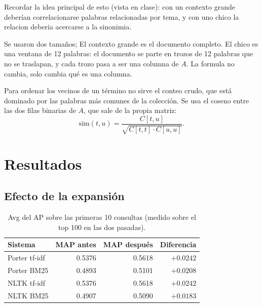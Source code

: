 \documentclass[11pt,letterpaper]{article}
\begin{document}
Recordar la idea principal de esto (vista en clase): con un contexto grande deberían correlacionarse palabras
relacionadas por tema, y con uno chico la relacion deberia acercarse a
la sinonimia. 

Se usaron dos tamaños; El contexto grande es el
documento completo. El chico es una ventana de 12 palabras: el
documento se parte en trozos de 12 palabras que no se traslapan, y
cada trozo pasa a ser una columna de $A$. La formula no cambia, solo
cambia qué es una columna.

Para ordenar los vecinos de un término no sirve el conteo crudo, que
está dominado por las palabras más comunes de la colección. Se usa el
coseno entre las dos filas binarias de $A$, que sale de la propia
matriz:
\[
    \mathrm{sim}(t, u) = \frac{C[t,u]}{\sqrt{C[t,t] \cdot C[u,u]}} .
\]


\section{Resultados}

\subsection*{Efecto de la expansión}

\begin{table}[H]
  \centering
  \begin{tabular}{lrrr}
    \toprule
    \textbf{Sistema} & \textbf{MAP antes} & \textbf{MAP después}
      & \textbf{Diferencia} \\
    \midrule
    Porter tf-idf & 0.5376 & 0.5618 & $+0.0242$ \\
    Porter BM25   & 0.4893 & 0.5101 & $+0.0208$ \\
    NLTK tf-idf   & 0.5376 & 0.5618 & $+0.0242$ \\
    NLTK BM25     & 0.4907 & 0.5090 & $+0.0183$ \\
    \bottomrule
  \end{tabular}
  \caption{Avg del AP sobre las primeras 10 consultas (medido
    sobre el top 100 en las dos pasadas).}
  \label{tab:map}
\end{table}
\end{document}
